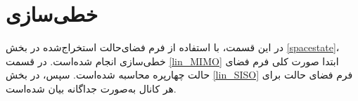\section{خطی‌سازی}
در این قسمت، با استفاده از فرم فضای‌حالت استخراج‌شده در بخش 
\ref{spacestate}،
 خطی‌سازی انجام شده‌‌است. در قسمت 
\ref{lin_MIMO}
ابتدا صورت کلی فرم فضای حالت چهارپره محاسبه شده‌است. سپس، در بخش
\ref{lin_SISO}
فرم فضای حالت برای هر کانال به‌صورت جداگانه بیان شده‌است.
